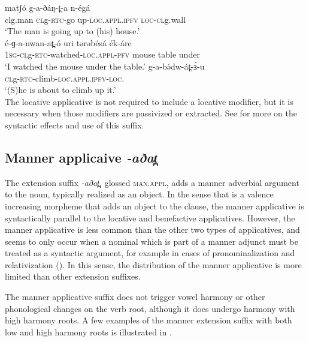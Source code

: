 \ex	\gll matʃó 	g-a-ðáŋ-t̪-a 				n-égá\\
clg.man		\textsc{cl}g-\textsc{rtc}-go up-\textsc{loc.appl.ipfv}	\textsc{loc-cl}g.wall\\
		\glt ‘The man is going up to (his) house.’\\
\ex	\gll é-ɡ-a-nwan-at̪-ó	uri		tərəbésá	ék-áre\\
	\textsc{1sg-cl}g-\textsc{rtc}-watched-\textsc{loc.appl-pfv}		mouse		table		under\\
\glt	`I watched the mouse under the table.'
 \label{ex:ch11:locad} %
\ex 	\gll g-a-bə́dw-át̪-ɜ́-u  \\
	\textsc{cl}g-\textsc{rtc}-climb-\textsc{loc.appl.ipfv-loc}.\\
	\glt `(S)he is about to climb up it.' \\ \label{ex:ch11:locu}
\z
\z
The locative applicative is not required to include a locative modifier, but it is necessary when those modifiers are passivized or extracted. See  for more on the syntactic effects and use of this suffix.
 

\subsection{Manner applicaive \textit{-aðat̪} }

The extension suffix \textit{-aðat̪}, glossed \textsc{man.appl}, adds a manner adverbial argument to the noun, typically realized as an object. In the sense that is a valence increasing morpheme that adds an object to the clause, the manner applicative is syntactically parallel to the locative and benefactive applicatives. However, the manner applicative is less common than the other two types of applicatives, and seems to only occur when a nominal which is part of a manner adjunct must be treated as a syntactic argument, for example in cases of pronominalization and relativization ().  In this sense, the distribution of the manner applicative is more limited than other extension suffixes.

The manner applicative suffix does not trigger vowel harmony or other phonological changes on the verb root, although it does undergo harmony with high harmony roots. A few examples of the manner extension suffix with both low and high harmony roots is illustrated in .


